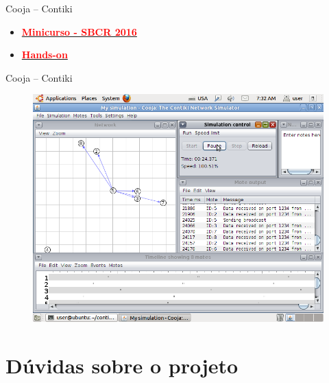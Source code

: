 \documentclass{beamer}
\begin{document}
\begin{frame}

\begin{block}{Cooja -- Contiki}

	\begin{itemize}
        \item \href{https://bps90.github.io/papers/Internet-das-coisas-da-teroria-a-pratica/}{\textcolor{red}{\textbf{Minicurso - SBCR 2016}}}
        \item \href{https://www.youtube.com/watch?v=62dzCelBwIk}{\textcolor{red}{\textbf{Hands-on}}}
    \end{itemize}

\end{block}

\begin{block}{Cooja -- Contiki}

	\begin{figure}[t]
		\includegraphics[width=.8\linewidth]{img/cooja.png}
	\end{figure}

\end{block}

\end{frame}
%
\section{Dúvidas sobre o projeto}
\end{document}
